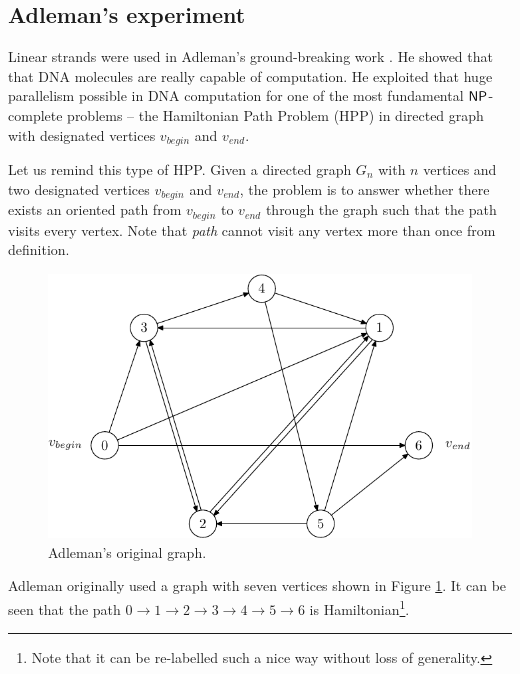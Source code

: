 	\subsection{Adleman's experiment}
	\label{sec:adleman}
		
		Linear strands were used in Adleman's ground-breaking work \cite{adleman94}. He showed that that DNA molecules are really capable of computation. He exploited that huge parallelism possible in DNA computation for one of the most fundamental $\mathsf{NP}$-complete problems -- the Hamiltonian Path Problem (HPP) in directed graph with designated vertices $v_{begin}$ and $v_{end}$.
		
		Let us remind this type of HPP. Given a directed graph $G_n$ with $n$ vertices and two designated vertices $v_{begin}$ and $v_{end}$, the problem is to answer whether there exists an oriented path from $v_{begin}$ to $v_{end}$ through the graph such that the path visits every vertex. Note that {\em path} cannot visit any vertex more than once from definition.
		
		\begin{figure}[H]
		\begin{center}
			\includegraphics{./figures/adleman_graph.pdf}
			\caption{Adleman's original graph.}
			\label{fig:adleman_graph}
		\end{center}
		\end{figure}
		
		Adleman originally used a graph with seven vertices shown in Figure \ref{fig:adleman_graph}. It can be seen that the path $0 \rightarrow 1 \rightarrow 2 \rightarrow 3 \rightarrow 4 \rightarrow 5 \rightarrow 6$ is Hamiltonian\footnote{Note that it can be re-labelled such a nice way without loss of generality.}.
		
